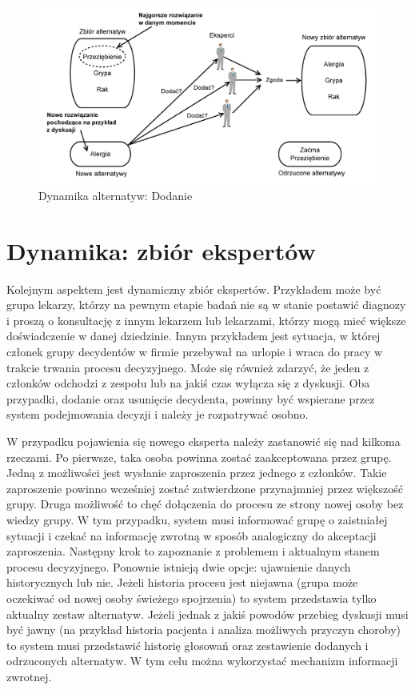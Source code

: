 \begin{figure}[ht]
  \includegraphics[width=\linewidth]
  	{chapters/modelinggroupdecision/dodanie_alternatyw-eps-converted-to.pdf}
  \caption{Dynamika alternatyw: Dodanie}
  \label{fig:dynamika_alternatyw_dodanie}
\end{figure}

\section{Dynamika: zbiór ekspertów}
Kolejnym aspektem jest dynamiczny zbiór ekspertów. Przykładem może być grupa
lekarzy, którzy na pewnym etapie badań nie są w stanie postawić diagnozy i
proszą o konsultację z innym lekarzem lub lekarzami, którzy mogą mieć większe
doświadczenie w danej dziedzinie. Innym przykładem jest sytuacja, w której
członek grupy decydentów w firmie przebywał na urlopie i wraca do pracy w
trakcie trwania procesu decyzyjnego. Może się również zdarzyć, że jeden z
członków odchodzi z zespołu lub na jakiś czas wyłącza się z dyskusji. Oba
przypadki, dodanie oraz usunięcie decydenta, powinny być wspierane przez system
podejmowania decyzji i należy je rozpatrywać osobno.

W przypadku pojawienia się nowego eksperta należy zastanowić się nad kilkoma
rzeczami. Po pierwsze, taka osoba powinna zostać zaakceptowana przez grupę.
Jed\-ną z możliwości jest wysłanie zaproszenia przez jednego z członków. Takie
zaproszenie powinno wcześniej zostać zatwierdzone przynajmniej przez większość
grupy. Druga możliwość to chęć dołączenia do procesu ze strony nowej osoby bez
wiedzy grupy. W tym przypadku, system musi informować grupę o zaistniałej
sytuacji i czekać na informację zwrotną w sposób analogiczny do akceptacji
zaproszenia. Następny krok to zapoznanie z problemem i aktualnym stanem procesu
decyzyjnego. Ponownie istnieją dwie opcje: ujawnienie danych historycznych lub
nie. Jeżeli historia procesu jest niejawna (grupa może oczekiwać od nowej osoby
świeżego spojrzenia) to system przedstawia tylko aktualny zestaw alternatyw.
Jeżeli jednak z jakiś powodów przebieg dyskusji musi być jawny (na przykład
historia pacjenta i analiza możliwych przyczyn choroby) to system musi
przedstawić historię głosowań oraz zestawienie dodanych i odrzuconych
alternatyw. W tym celu można wykorzystać mechanizm informacji zwrotnej.

